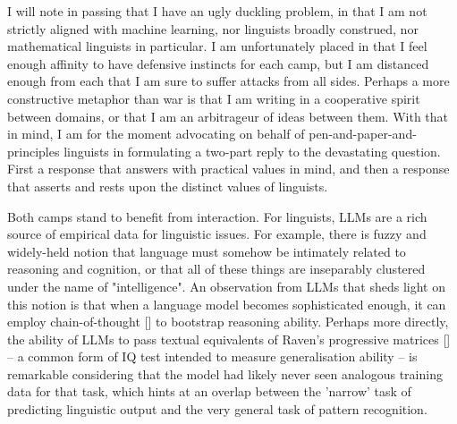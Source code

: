 I will note in passing that I have an ugly duckling problem, in that I am not strictly aligned with machine learning, nor linguists broadly construed, nor mathematical linguists in particular. I am unfortunately placed in that I feel enough affinity to have defensive instincts for each camp, but I am distanced enough from each that I am sure to suffer attacks from all sides. Perhaps a more constructive metaphor than war is that I am writing in a cooperative spirit between domains, or that I am an arbitrageur of ideas between them. With that in mind, I am for the moment advocating on behalf of pen-and-paper-and-principles linguists in formulating a two-part reply to the devastating question. First a response that answers with practical values in mind, and then a response that asserts and rests upon the distinct values of linguists.


Both camps stand to benefit from interaction. For linguists, LLMs are a rich source of empirical data for linguistic issues. For example, there is fuzzy and widely-held notion that language must somehow be intimately related to reasoning and cognition, or that all of these things are inseparably clustered under the name of "intelligence". An observation from LLMs that sheds light on this notion is that when a language model becomes sophisticated enough, it can employ chain-of-thought [] to bootstrap reasoning ability. Perhaps more directly, the ability of LLMs to pass textual equivalents of Raven's progressive matrices [] -- a common form of IQ test intended to measure generalisation ability -- is remarkable considering that the model had likely never seen analogous training data for that task, which hints at an overlap between the 'narrow' task of predicting linguistic output and the very general task of pattern recognition.\\

